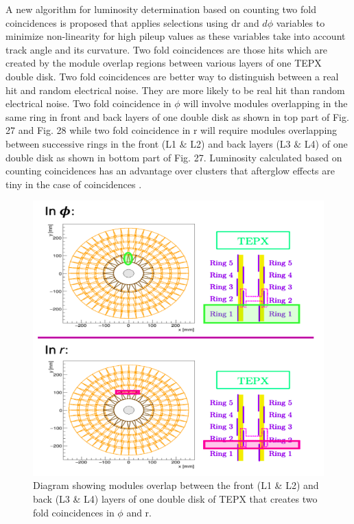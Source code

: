 A new algorithm for luminosity determination based on counting two fold coincidences is proposed that applies selections using dr and $d\phi$ variables to minimize non-linearity for high pileup values as these variables take into account track angle and its curvature. Two fold coincidences are those hits which are created by the module overlap regions between various layers of one TEPX double disk. Two fold coincidences are better way to distinguish between a real hit and random electrical noise. They are more likely to be real hit than random electrical noise. Two fold coincidence in $\phi$ will involve modules overlapping in the same ring in front and back layers of one double disk as shown in top part of Fig. 27 and Fig. 28 while two fold coincidence in r will require modules overlapping between successive rings in the front (L1 $\&$ L2) and back layers (L3 $\&$ L4) of one double disk as shown in bottom part of Fig. 27. Luminosity calculated based on counting coincidences has an advantage over clusters that afterglow effects are tiny in the case of coincidences  \cite{Collaboration:2706512} \cite{brilsim} \cite{brilsim1}\cite{brilsim2}.\\



\begin{figure}[H]
  \centering
  \includegraphics[width=0.7\columnwidth]{./2foldinrphi.png}
  \caption{ \onehalfspacing Diagram showing modules overlap between the front (L1 \& L2) and back (L3 \& L4) layers of one double disk of TEPX that creates two fold coincidences in $\phi$ and r.}
  \label{fig:CMS}
\end{figure}

